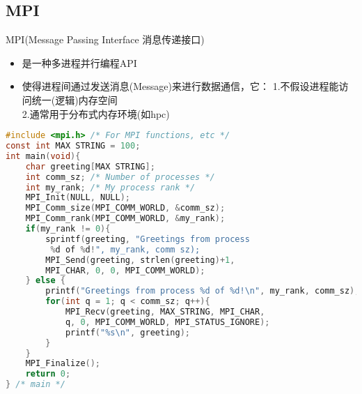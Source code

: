 
\subsection{MPI}
MPI(Message Passing Interface 消息传递接口)
\begin{itemize}
\item 是一种多进程并行编程API
\item 使得进程间通过发送消息(Message)来进行数据通信，它：
1.不假设进程能访问统一(逻辑)内存空间\\
2.通常用于分布式内存环境(如hpc)
\end{itemize}
\begin{lstlisting}[language=c]
#include <mpi.h> /* For MPI functions, etc */
const int MAX STRING = 100;
int main(void){
    char greeting[MAX STRING];
    int comm_sz; /* Number of processes */
    int my_rank; /* My process rank */
    MPI_Init(NULL, NULL);
    MPI_Comm_size(MPI_COMM_WORLD, &comm_sz);
    MPI_Comm_rank(MPI_COMM_WORLD, &my_rank);
    if(my_rank != 0){
        sprintf(greeting, "Greetings from process
         %d of %d!", my_rank, comm sz);
        MPI_Send(greeting, strlen(greeting)+1, 
        MPI_CHAR, 0, 0, MPI_COMM_WORLD);
    } else {
        printf("Greetings from process %d of %d!\n", my_rank, comm_sz);
        for(int q = 1; q < comm_sz; q++){
            MPI_Recv(greeting, MAX_STRING, MPI_CHAR,
            q, 0, MPI_COMM_WORLD, MPI_STATUS_IGNORE);
            printf("%s\n", greeting);
        }
    }
    MPI_Finalize();
    return 0;
} /* main */
\end{lstlisting}